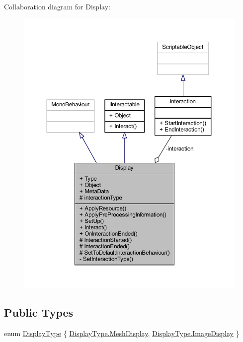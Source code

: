Collaboration diagram for Display\+:
\nopagebreak
\begin{figure}[H]
\begin{center}
\leavevmode
\includegraphics[width=350pt]{class_display__coll__graph}
\end{center}
\end{figure}
\subsection*{Public Types}
\begin{DoxyCompactItemize}
\item 
enum \mbox{\hyperlink{class_display_a7f7abc559192ef7e8f4a03382d3492d7}{Display\+Type}} \{ \mbox{\hyperlink{class_display_a7f7abc559192ef7e8f4a03382d3492d7a6465642df623349960f917dcf68ba989}{Display\+Type.\+Mesh\+Display}}, 
\mbox{\hyperlink{class_display_a7f7abc559192ef7e8f4a03382d3492d7a6790a36b5a0528029d4ed43891266fcb}{Display\+Type.\+Image\+Display}}
 \}
\end{DoxyCompactItemize}
